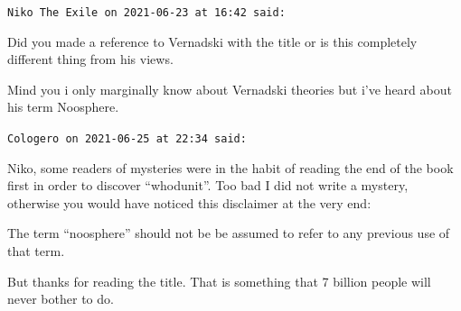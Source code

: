 \begin{footnotesize}
\begin{sffamily}
\texttt{Niko The Exile on 2021-06-23 at 16:42 said:}

Did you made a reference to Vernadski with the title or is this completely different thing from his views.

Mind you i only marginally know about Vernadski theories but i've heard about his term Noosphere.

\hfill

\texttt{Cologero on 2021-06-25 at 22:34 said:}

Niko, some readers of mysteries were in the habit of reading the end of the book first in order to discover ``whodunit''. Too bad I did not write a mystery, otherwise you would have noticed this disclaimer at the very end:

\begin{quotex}

The term ``noosphere'' should not be be assumed to refer to any previous use of that term.
\end{quotex}


But thanks for reading the title. That is something that 7 billion people will never bother to do.

\end{sffamily}
\end{footnotesize}

